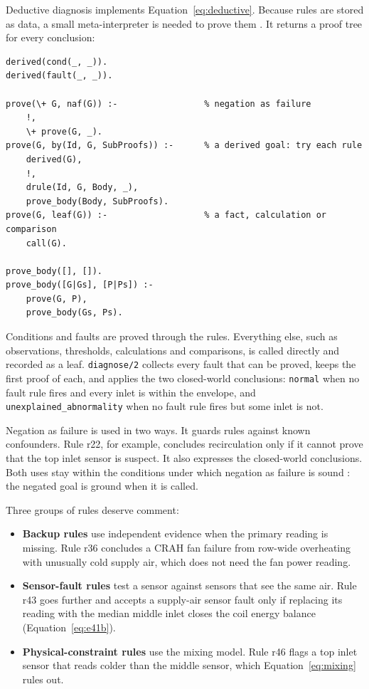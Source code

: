 Deductive diagnosis implements Equation~\eqref{eq:deductive}. Because rules are stored as data, a small meta-interpreter is needed to prove them \parencite{bratko2012}. It returns a proof tree for every conclusion:
\begin{lstlisting}
derived(cond(_, _)).
derived(fault(_, _)).

prove(\+ G, naf(G)) :-                 % negation as failure
    !,
    \+ prove(G, _).
prove(G, by(Id, G, SubProofs)) :-      % a derived goal: try each rule
    derived(G),
    !,
    drule(Id, G, Body, _),
    prove_body(Body, SubProofs).
prove(G, leaf(G)) :-                   % a fact, calculation or comparison
    call(G).

prove_body([], []).
prove_body([G|Gs], [P|Ps]) :-
    prove(G, P),
    prove_body(Gs, Ps).
\end{lstlisting}
Conditions and faults are proved through the rules. Everything else, such as observations, thresholds, calculations and comparisons, is called directly and recorded as a leaf. \texttt{diagnose/2} collects every fault that can be proved, keeps the first proof of each, and applies the two closed-world conclusions: \texttt{normal} when no fault rule fires and every inlet is within the envelope, and \texttt{unexplained\_abnormality} when no fault rule fires but some inlet is not.

Negation as failure is used in two ways. It guards rules against known confounders. Rule r22, for example, concludes recirculation only if it cannot prove that the top inlet sensor is suspect. It also expresses the closed-world conclusions. Both uses stay within the conditions under which negation as failure is sound \parencite{clark1978}: the negated goal is ground when it is called.

Three groups of rules deserve comment:
\begin{itemize}
  \item \textbf{Backup rules} use independent evidence when the primary reading is missing. Rule r36 concludes a CRAH fan failure from row-wide overheating with unusually cold supply air, which does not need the fan power reading.
  \item \textbf{Sensor-fault rules} test a sensor against sensors that see the same air. Rule r43 goes further and accepts a supply-air sensor fault only if replacing its reading with the median middle inlet closes the coil energy balance (Equation~\eqref{eq:e41b}).
  \item \textbf{Physical-constraint rules} use the mixing model. Rule r46 flags a top inlet sensor that reads colder than the middle sensor, which Equation~\eqref{eq:mixing} rules out.
\end{itemize}

